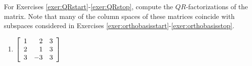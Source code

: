 \noindent For Exercises \ref{exer:QRstart}-\ref{exer:QRstop}, compute the $QR$-factorizations of the matrix. Note that many of the column spaces of these matrices coincide with subspaces considered in Exercises \ref{exer:orthobasisstart}-\ref{exer:orthobasisstop}.
\begin{enumerate}[!HW!, label=$\spadesuit$ \arabic*., ref=\arabic*]
\item\label{exer:QRstop} $\mtx{rrr}{1&2&3\\2&1&3\\3&-3&3}$ %
\end{enumerate}

 \mbox{}\vfill
 
\pagebreak